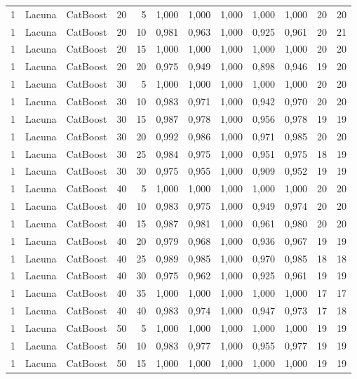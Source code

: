 \begin{longtable}{@{}rllrrrrrrrrr@{}}
1 & Lacuna & CatBoost & 20 & 5 & 1,000 & 1,000 & 1,000 & 1,000 & 1,000 & 20 & 20 \\
1 & Lacuna & CatBoost & 20 & 10 & 0,981 & 0,963 & 1,000 & 0,925 & 0,961 & 20 & 21 \\
1 & Lacuna & CatBoost & 20 & 15 & 1,000 & 1,000 & 1,000 & 1,000 & 1,000 & 20 & 20 \\
1 & Lacuna & CatBoost & 20 & 20 & 0,975 & 0,949 & 1,000 & 0,898 & 0,946 & 19 & 20 \\
1 & Lacuna & CatBoost & 30 & 5 & 1,000 & 1,000 & 1,000 & 1,000 & 1,000 & 20 & 20 \\
1 & Lacuna & CatBoost & 30 & 10 & 0,983 & 0,971 & 1,000 & 0,942 & 0,970 & 20 & 20 \\
1 & Lacuna & CatBoost & 30 & 15 & 0,987 & 0,978 & 1,000 & 0,956 & 0,978 & 19 & 19 \\
1 & Lacuna & CatBoost & 30 & 20 & 0,992 & 0,986 & 1,000 & 0,971 & 0,985 & 20 & 20 \\
1 & Lacuna & CatBoost & 30 & 25 & 0,984 & 0,975 & 1,000 & 0,951 & 0,975 & 18 & 19 \\
1 & Lacuna & CatBoost & 30 & 30 & 0,975 & 0,955 & 1,000 & 0,909 & 0,952 & 19 & 19 \\
1 & Lacuna & CatBoost & 40 & 5 & 1,000 & 1,000 & 1,000 & 1,000 & 1,000 & 20 & 20 \\
1 & Lacuna & CatBoost & 40 & 10 & 0,983 & 0,975 & 1,000 & 0,949 & 0,974 & 20 & 20 \\
1 & Lacuna & CatBoost & 40 & 15 & 0,987 & 0,981 & 1,000 & 0,961 & 0,980 & 20 & 20 \\
1 & Lacuna & CatBoost & 40 & 20 & 0,979 & 0,968 & 1,000 & 0,936 & 0,967 & 19 & 19 \\
1 & Lacuna & CatBoost & 40 & 25 & 0,989 & 0,985 & 1,000 & 0,970 & 0,985 & 18 & 18 \\
1 & Lacuna & CatBoost & 40 & 30 & 0,975 & 0,962 & 1,000 & 0,925 & 0,961 & 19 & 19 \\
1 & Lacuna & CatBoost & 40 & 35 & 1,000 & 1,000 & 1,000 & 1,000 & 1,000 & 17 & 17 \\
1 & Lacuna & CatBoost & 40 & 40 & 0,983 & 0,974 & 1,000 & 0,947 & 0,973 & 17 & 18 \\
1 & Lacuna & CatBoost & 50 & 5 & 1,000 & 1,000 & 1,000 & 1,000 & 1,000 & 19 & 19 \\
1 & Lacuna & CatBoost & 50 & 10 & 0,983 & 0,977 & 1,000 & 0,955 & 0,977 & 19 & 19 \\
1 & Lacuna & CatBoost & 50 & 15 & 1,000 & 1,000 & 1,000 & 1,000 & 1,000 & 19 & 19 \\

\end{longtable}

